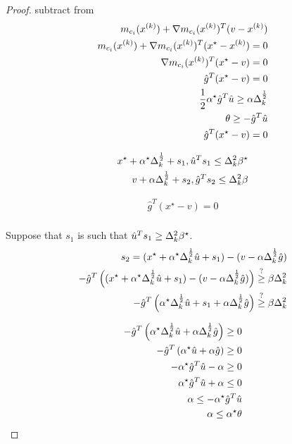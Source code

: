 \begin{proof}
subtract from
\begin{align*}
m_{c_i}({x^{(k)}}) + \nabla m_{c_i}({x^{(k)}})^T (v - {x^{(k)}}) \\
m_{c_i}({x^{(k)}}) + \nabla m_{c_i}({x^{(k)}})^T (x^{\star} - {x^{(k)}}) = 0 \\
\nabla m_{c_i}({x^{(k)}})^T (x^{\star} - v) = 0 \\
\hat g^T (x^{\star} - v) = 0 \\
\frac 1 2 \alpha^{\star} \hat g^T\hat u \ge \alpha \Delta_k^{\frac 1 2} \\
\theta \ge - \hat g^T\hat u \\ 
\hat g^T (x^{\star} - v) = 0 \\
\end{align*}


\begin{align*}
x^{\star} + \alpha^{\star}\Delta_k^{\frac 1 2} + s_1, \hat u^Ts_1 \le \Delta_k^2 \beta^{\star} \\
v + \alpha \Delta_k^{\frac 1 2} + s_2, \hat g^T s_2 \le \Delta_k^2 \beta \\
\end{align*}

\begin{align*}
\hat g^T (x^{\star} - v) = 0 \\
\end{align*}

Suppose that $s_1$ is such that $\hat u^Ts_1 \ge \Delta_k^2 \beta^{\star}$.
\begin{align*}
s_2 = (x^{\star} + \alpha^{\star}\Delta_k^{\frac 1 2}\hat u + s_1) - (v - \alpha \Delta_k^{\frac 1 2}\hat g) \\
-\hat g^T \left((x^{\star} + \alpha^{\star}\Delta_k^{\frac 1 2}\hat u + s_1) - (v - \alpha \Delta_k^{\frac 1 2}\hat g)\right) \stackrel{?}{\ge} \beta\Delta_k^{2}\\
-\hat g^T \left(\alpha^{\star}\Delta_k^{\frac 1 2}\hat u + s_1 + \alpha \Delta_k^{\frac 1 2}\hat g\right) \stackrel{?}{\ge} \beta\Delta_k^{2}\\
\end{align*}





\begin{align*}
-\hat g^T \left(\alpha^{\star}\Delta_k^{\frac 1 2}\hat u + \alpha \Delta_k^{\frac 1 2}\hat g\right) \ge 0 \\
-\hat g^T \left(\alpha^{\star}\hat u + \alpha\hat g\right) \ge 0 \\
-\alpha^{\star}\hat g^T\hat u - \alpha \ge 0 \\
\alpha^{\star}\hat g^T\hat u + \alpha \le 0 \\
\alpha \le -\alpha^{\star}\hat g^T\hat u \\
\alpha \le \alpha^{\star}\theta \\
\end{align*}



\end{proof}
